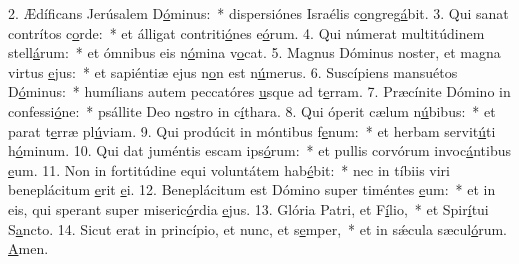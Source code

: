 2. Ædíficans Jerúsalem D\uline{ó}minus:~* dispersiónes Israélis c\uline{o}ngreg\uline{á}bit.
3. Qui sanat contrítos c\uline{o}rde:~* et álligat contriti\uline{ó}nes e\uline{ó}rum.
4. Qui númerat multitúdinem stell\uline{á}rum:~* et ómnibus eis n\uline{ó}mina v\uline{o}cat.
5. Magnus Dóminus noster, et magna virtus \uline{e}jus:~* et sapiéntiæ ejus n\uline{o}n est n\uline{ú}merus.
6. Suscípiens mansuétos D\uline{ó}minus:~* humílians autem peccatóres \uline{u}sque ad t\uline{e}rram.
7. Præcínite Dómino in confessi\uline{ó}ne:~* psállite Deo n\uline{o}stro in c\uline{í}thara.
8. Qui óperit cælum n\uline{ú}bibus:~* et parat t\uline{e}rræ pl\uline{ú}viam.
9. Qui prodúcit in móntibus f\uline{e}num:~* et herbam servit\uline{ú}ti h\uline{ó}minum.
10. Qui dat juméntis escam ips\uline{ó}rum:~* et pullis corvórum invoc\uline{á}ntibus \uline{e}um.
11. Non in fortitúdine equi voluntátem hab\uline{é}bit:~* nec in tíbiis viri beneplácitum \uline{e}rit \uline{e}i.
12. Beneplácitum est Dómino super timéntes \uline{e}um:~* et in eis, qui sperant super miseric\uline{ó}rdia \uline{e}jus.
13. Glória Patri, et F\uline{í}lio,~* et Spir\uline{í}tui S\uline{a}ncto.
14. Sicut erat in princípio, et nunc, et s\uline{e}mper,~* et in sǽcula sæcul\uline{ó}rum. \uline{A}men.
